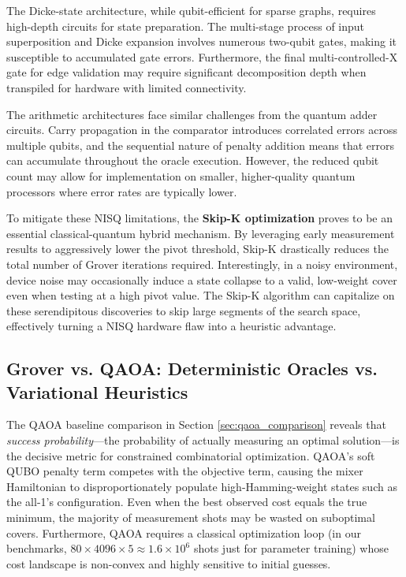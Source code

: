 \documentclass{ieeeaccess}
\begin{document}
The Dicke-state architecture, while qubit-efficient for sparse graphs, requires high-depth circuits for state preparation. The multi-stage process of input superposition and Dicke expansion involves numerous two-qubit gates, making it susceptible to accumulated gate errors. Furthermore, the final multi-controlled-X gate for edge validation may require significant decomposition depth when transpiled for hardware with limited connectivity.

The arithmetic architectures face similar challenges from the quantum adder circuits. Carry propagation in the comparator introduces correlated errors across multiple qubits, and the sequential nature of penalty addition means that errors can accumulate throughout the oracle execution. However, the reduced qubit count may allow for implementation on smaller, higher-quality quantum processors where error rates are typically lower.

To mitigate these NISQ limitations, the \textbf{Skip-K optimization} proves to be an essential classical-quantum hybrid mechanism. By leveraging early measurement results to aggressively lower the pivot threshold, Skip-K drastically reduces the total number of Grover iterations required. Interestingly, in a noisy environment, device noise may occasionally induce a state collapse to a valid, low-weight cover even when testing at a high pivot value. The Skip-K algorithm can capitalize on these serendipitous discoveries to skip large segments of the search space, effectively turning a NISQ hardware flaw into a heuristic advantage.

\subsection{Grover vs. QAOA: Deterministic Oracles vs. Variational Heuristics}
The QAOA baseline comparison in Section \ref{sec:qaoa_comparison} reveals that \emph{success probability}---the probability of actually measuring an optimal solution---is the decisive metric for constrained combinatorial optimization. QAOA's soft QUBO penalty term competes with the objective term, causing the mixer Hamiltonian to disproportionately populate high-Hamming-weight states such as the all-1's configuration. Even when the best observed cost equals the true minimum, the majority of measurement shots may be wasted on suboptimal covers. Furthermore, QAOA requires a classical optimization loop (in our benchmarks, $80 \times 4096 \times 5 \approx 1.6 \times 10^6$ shots just for parameter training) whose cost landscape is non-convex and highly sensitive to initial guesses.
\end{document}
